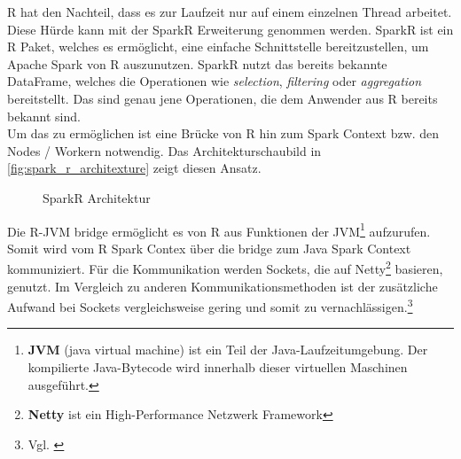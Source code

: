 \noindent
R hat den Nachteil, dass es zur Laufzeit nur auf einem einzelnen Thread arbeitet. Diese Hürde kann mit der SparkR Erweiterung genommen werden. SparkR ist ein R Paket, welches es ermöglicht, eine einfache Schnittstelle bereitzustellen, um Apache Spark von R auszunutzen. SparkR nutzt das bereits bekannte DataFrame, welches die Operationen wie \textsl{selection}, \textsl{filtering} oder \textsl{aggregation} bereitstellt. Das sind genau jene Operationen, die dem Anwender aus R bereits bekannt sind. \\

\noindent
Um das zu ermöglichen ist eine Brücke von R hin zum Spark Context bzw. den Nodes / Workern notwendig. Das Architekturschaubild in \autoref{fig:spark_r_architexture} zeigt diesen Ansatz. \\
\begin{figure}[h]
  \centering
  \caption{SparkR Architektur \cite{VYL+16}}\label{fig:spark_r_architexture}
\end{figure}

\noindent
Die R-JVM bridge ermöglicht es von R aus Funktionen der JVM\footnote{\textbf{JVM} (java virtual machine) ist ein Teil der Java-Laufzeitumgebung. Der kompilierte Java-Bytecode wird innerhalb dieser virtuellen Maschinen ausgeführt.} aufzurufen. Somit wird vom R Spark Contex über die bridge zum Java Spark Context kommuniziert. Für die Kommunikation werden Sockets, die auf Netty\footnote{\textbf{Netty} ist ein High-Performance Netzwerk Framework} basieren, genutzt. Im Vergleich zu anderen Kommunikationsmethoden ist der zusätzliche Aufwand bei Sockets vergleichsweise gering und somit zu vernachlässigen.\footnote{Vgl. \cite{VYL+16}} \\

